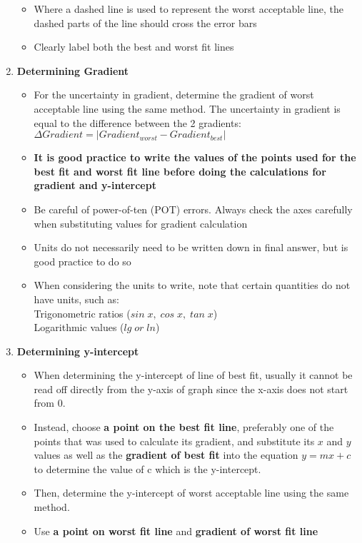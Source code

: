 \documentclass{article}
\begin{document}
\begin{enumerate}
\begin{itemize}
        \item Where a dashed line is used to represent the worst acceptable line, the dashed parts of the line should cross the error bars
        \item Clearly label both the best and worst fit lines
    \end{itemize}
    \item \textbf{Determining Gradient}
    \begin{itemize}
        \item For the uncertainty in gradient, determine the gradient of worst acceptable line using the same method. The uncertainty in gradient is equal to the difference between the 2 gradients:
        $\Delta Gradient = |Gradient_{worst}-Gradient_{best}|$
        \item \textbf{It is good practice to write the values of the points used for the best fit and worst fit line before doing the calculations for gradient and y-intercept}
        \item Be careful of power-of-ten (POT) errors. Always check the axes carefully when substituting values for gradient calculation
        \item Units do not necessarily need to be written down in final answer, but is good practice to do so
        \item When considering the units to write, note that certain quantities do not have units, such as:\\
        Trigonometric ratios ($sin \;x,\; cos \;x,\; tan \;x$)\\
        Logarithmic values ($lg \; or\; ln$)
    \end{itemize}
    \item \textbf{Determining y-intercept}
    \begin{itemize}
        \item When determining the y-intercept of line of best fit, usually it cannot be read off directly from the y-axis of graph since the x-axis does not start from 0.
        \item Instead, choose \textbf{a point on the best fit line}, preferably one of the points that was used to calculate its gradient, and substitute its $x$ and $y$ values as well as the \textbf{gradient of best fit} into the equation $y=mx+c$ to determine the value of c which is the y-intercept.
        \item Then, determine the y-intercept of worst acceptable line using the same method. 
        \item Use \textbf{a point on worst fit line} and \textbf{gradient of worst fit line}

\end{itemize}
\end{enumerate}
\end{document}
